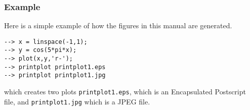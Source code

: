 \subsubsection{Example}
Here is a simple example of how the figures in this manual are generated.
\begin{verbatim}
--> x = linspace(-1,1);
--> y = cos(5*pi*x);
--> plot(x,y,'r-');
--> printplot printplot1.eps
--> printplot printplot1.jpg
\end{verbatim}
which creates two plots \verb|printplot1.eps|, which is an Encapsulated
Postscript file, and \verb|printplot1.jpg| which is a JPEG file.

